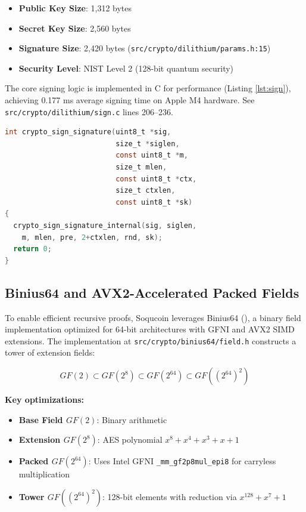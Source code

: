 \documentclass[10pt]{article}
\begin{document}
\begin{itemize}
    \item \textbf{Public Key Size}: 1,312 bytes
    \item \textbf{Secret Key Size}: 2,560 bytes
    \item \textbf{Signature Size}: 2,420 bytes (\texttt{src/crypto/dilithium/params.h:15})
    \item \textbf{Security Level}: NIST Level 2 (128-bit quantum security)
\end{itemize}

The core signing logic is implemented in C for performance (Listing \ref{lst:sign}), achieving 0.177 ms average signing time on Apple M4 hardware. See \texttt{src/crypto/dilithium/sign.c} lines 206--236.

\begin{lstlisting}[language=C, caption=Dilithium Signing (src/crypto/dilithium/sign.c), label={lst:sign}, firstnumber=206]
int crypto_sign_signature(uint8_t *sig,
                          size_t *siglen,
                          const uint8_t *m,
                          size_t mlen,
                          const uint8_t *ctx,
                          size_t ctxlen,
                          const uint8_t *sk)
{
  crypto_sign_signature_internal(sig, siglen, 
    m, mlen, pre, 2+ctxlen, rnd, sk);
  return 0;
}
\end{lstlisting}

\subsection{Binius64 and AVX2-Accelerated Packed Fields}
To enable efficient recursive proofs, Soqucoin leverages Binius64 (\cite{binius2023}), a binary field implementation optimized for 64-bit architectures with GFNI and AVX2 SIMD extensions. The implementation at \texttt{src/crypto/binius64/field.h} constructs a tower of extension fields:

\[
GF(2) \subset GF(2^8) \subset GF(2^{64}) \subset GF((2^{64})^2)
\]

\textbf{Key optimizations:}
\begin{itemize}
    \item \textbf{Base Field $GF(2)$}: Binary arithmetic
    \item \textbf{Extension $GF(2^8)$}: AES polynomial $x^8 + x^4 + x^3 + x + 1$
    \item \textbf{Packed $GF(2^{64})$}: Uses Intel GFNI \texttt{\_mm\_gf2p8mul\_epi8} for carryless multiplication
    \item \textbf{Tower $GF((2^{64})^2)$}: 128-bit elements with reduction via $x^{128} + x^7 + 1$
\end{itemize}
\end{document}
